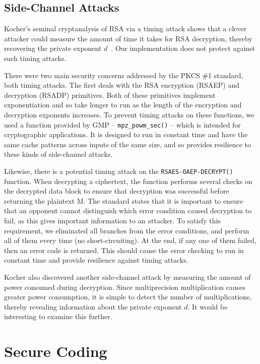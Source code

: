 \documentclass[letterpaper]{article}
\begin{document}
\subsection{Side-Channel Attacks}

Kocher's seminal cryptanalysis of RSA via a timing attack shows that a clever attacker could measure the amount of time it takes for RSA decryption, thereby recovering the private exponent $d$~\cite{kocher1996timing}. Our implementation does not protect against such timing attacks.

There were two main security concerns addressed by the PKCS \#1 standard, both timing attacks. The first deals with the RSA encryption (RSAEP) and decryption (RSADP) primitives. Both of these primitives implement exponentiation and so take longer to run as the length of the encryption and decryption exponents increases. To prevent timing attacks on these functions, we used a function provided by GMP – {\tt mpz\_powm\_sec()} – which is intended for cryptographic applications. It is designed to run in constant time and have the same cache patterns across inputs of the same size, and so provides resilience to these kinds of side-channel attacks.

Likewise, there is a potential timing attack on the {\tt RSAES-OAEP-DECRYPT()} function. When decrypting a ciphertext, the function performs several checks on the decrypted data block to ensure that decryption was successful before returning the plaintext M. The standard states that it is important to ensure that an opponent cannot distinguish which error condition caused decryption to fail, as this gives important information to an attacker. To satisfy this requirement, we eliminated all branches from the error conditions, and perform all of them every time (no short-circuiting). At the end, if any one of them failed, then an error code is returned. This should cause the error checking to run in constant time and provide resilience against timing attacks.

Kocher also discovered another side-channel attack by measuring the amount of power consumed during decryption. Since multiprecision multiplication causes greater power consumption, it is simple to detect the number of multiplications, thereby revealing information about the private exponent $d$. It would be interesting to examine this further.

\section{Secure Coding}
\end{document}
